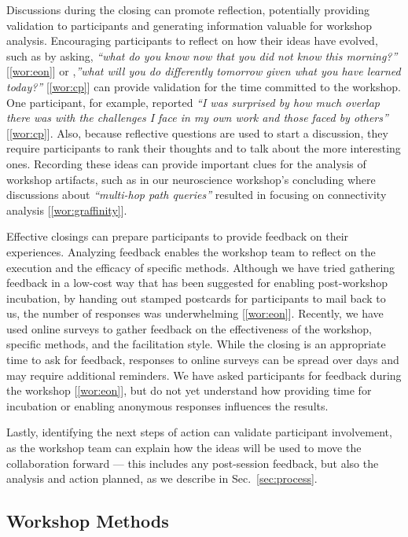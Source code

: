 Discussions during the closing can promote reflection, potentially providing validation to participants and generating information valuable for workshop analysis. Encouraging participants to reflect on how their ideas have evolved, such as by asking, \emph{``what do you know now that you did not know this morning?''} [\ref{wor:eon}] or ,\emph{''what will you do differently tomorrow given what you have learned today?''} [\ref{wor:cp}] can provide validation for the time committed to the workshop. One participant, for example, reported \emph{``I was surprised by how much overlap there was with the challenges I face in my own work and those faced by others''} [\ref{wor:cp}]. Also, because reflective questions are used to start a discussion, they require participants to rank their thoughts and to talk about the more interesting ones. Recording these ideas can provide important clues for the analysis of workshop artifacts, such as in our neuroscience workshop's concluding where discussions about \emph{``multi-hop path queries''} resulted in focusing on connectivity analysis [\ref{wor:graffinity}].

Effective closings can prepare participants to provide feedback on their experiences. Analyzing feedback enables the workshop team to reflect on the execution and the efficacy of specific methods. Although we have tried gathering feedback in a low-cost way that has been suggested for enabling post-workshop incubation, by handing out stamped postcards for participants to mail back to us, the number of responses was underwhelming [\ref{wor:eon}]. Recently, we have used online surveys to gather feedback on the effectiveness of the workshop, specific methods, and the facilitation style. While the closing is an appropriate time to ask for feedback, responses to online surveys can be spread over days and may require additional reminders. We have asked participants for feedback during the workshop [\ref{wor:eon}], but do not yet understand how providing time for incubation or enabling anonymous responses influences the results.

Lastly, identifying the next steps of action can validate participant involvement, as the workshop team can explain how the ideas will be used to move the collaboration forward --- this includes any post-session feedback, but also the analysis and action planned, as we describe in Sec.~\ref{sec:process}. 

\subsection{Workshop Methods}
\label{sec:workshop-methods}

